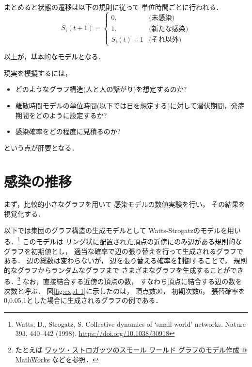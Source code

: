 \documentclass[10pt,oneside]{scrartcl}
\begin{document}
まとめると状態の遷移は以下の規則に従って
単位時間ごとに行われる．
\begin{equation}
  S_{i}(t{+}1)
  =
  \begin{cases}
    0,&\text{(未感染)}\\
    1,&\text{(新たな感染)}\\
    S_{i}(t)+1&\text{(それ以外)}
  \end{cases}
\end{equation}

以上が，基本的なモデルとなる．

現実を模擬するには，
\begin{itemize}
\item どのようなグラフ構造(人と人の繋がり)を想定するのか?
\item 離散時間モデルの単位時間(以下では日を想定する)に対して潜伏期間，発症期間をどのように設定するか?
\item 感染確率をどの程度に見積るのか?
\end{itemize}
という点が肝要となる．

\section{感染の推移}
\label{sec:org488f49f}

まず，比較的小さなグラフを用いて
感染モデルの数値実験を行い，
その結果を視覚化する．

\begin{figure*}%
  \centering
\end{figure*}

以下では集団のグラフ構造の生成モデルとして
Watts-Strogatzのモデルを用いる．\footnote{Watts, D., Strogatz, S. Collective dynamics of ‘small-world’ networks. Nature 393, 440–442 (1998). \url{https://doi.org/10.1038/30918}}
このモデルは
リング状に配置された頂点の近傍にのみ辺がある規則的なグラフを初期値とし，
適当な確率で辺の張り替えを行って生成されるグラフである．
辺の総数は変わらないが，
辺を張り替える確率を制御することで，
規則的なグラフからランダムなグラフまで
さまざまなグラフを生成することができる．\footnote{たとえば \href{https://jp.mathworks.com/help/matlab/math/build-watts-strogatz-small-world-graph-model.html}{ワッツ・ストロガッツのスモール ワールド グラフのモデル作成 @ MathWorks} 
などを参照．}
なお，直接結合する近傍の頂点の数，
すなわち頂点に結合する辺の数を次数と呼ぶ．
図\ref{fig:exp1-1}に示したのは，
頂点数30，
初期次数6，
張替確率を0,0.05,1とした場合に生成されるグラフの例である．
\end{document}
